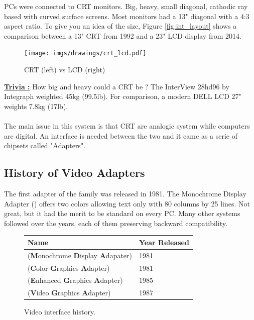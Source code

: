 \documentclass[book.tex]{subfiles}
\begin{document}
PCs were connected to CRT monitors. Big, heavy, small diagonal, cathodic ray based with curved surface screens. Most monitors had a 13" diagonal with a 4:3 aspect ratio. To give you an idea of the size, Figure \ref{fig:int_layout} shows a comparison between a 13" CRT from 1992 and a 23" LCD display from 2014.\\

\begin{figure}[H]
\centering
\texttt{[image: imgs/drawings/crt\_lcd.pdf]}
\caption{CRT (left) vs LCD (right)}
\label{fig:lcd_vs_crt}
\end{figure}

\textbf{\underline{Trivia :}} How big and heavy could a CRT be ? The InterView 28hd96 by Integraph weighted 45kg (99.5lb). For comparison, a modern DELL LCD 27" weights 7.8kg (17lb).\\
\\
The main issue in this system is that CRT are analogic system while computers are digital. An interface is needed between the two and it came as a serie of chipsets called "Adapters". 

  \subsection{History of Video Adapters}

The first adapter of the family was released in 1981. The Monochrome Display
   Adapter () offers two colors allowing text only with 80 columns by 25 lines.  Not great, but it had the merit to be standard on every PC. Many other systems followed over the years, each of them preserving backward compatibility.
\bigskip
  
 \begin{figure}[H]
\centering  
\begin{tabularx}{\textwidth}{ X  Y }
  \toprule
  \textbf{Name} &  \textbf{Year Released} \\
  \toprule {}
   (\textbf{M}onochrome
   \textbf{D}isplay
   \textbf{A}dapater) & 1981 
   \\ 
   (\textbf{C}olor
   \textbf{G}raphics
   \textbf{A}dapter) & 1981 
    \\ 
   (\textbf{E}nhanced
   \textbf{G}raphics
   \textbf{A}dapter) & 1985
   \\ 
   (\textbf{V}ideo
   \textbf{G}raphics
   \textbf{A}dapter)  & 1987
    \\
  \toprule
\end{tabularx}
\caption{Video interface history.}\label{fig:vga_history}
\end{figure}
\end{document}
